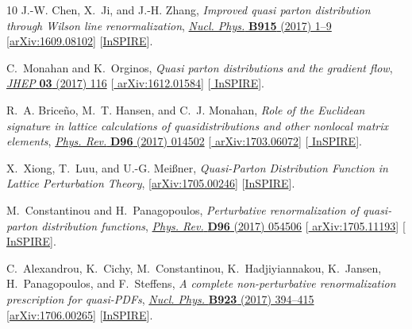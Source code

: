 \begin{thebibliography}{10}
J.-W. Chen, X.~Ji, and J.-H. Zhang, {\it {Improved quasi parton distribution
  through Wilson line renormalization}},
\href{http://dx.doi.org/10.1016/j.nuclphysb.2016.12.004}{{\em Nucl. Phys.}
  {\bfseries B915} (2017) 1--9}
  [\href{http://arxiv.org/abs/1609.08102}{{\ttfamily arXiv:1609.08102}}]
  [\href{http://inspirehep.net/record/1488113}{{\ttfamily InSPIRE}}].

C.~Monahan and K.~Orginos, {\it {Quasi parton distributions and the gradient
  flow}},
\href{http://dx.doi.org/10.1007/JHEP03(2017)116}{{\em JHEP} {\bfseries 03}
  (2017) 116} [\href{http://arxiv.org/abs/1612.01584}{{\ttfamily
  arXiv:1612.01584}}] [\href{http://inspirehep.net/record/1501937}{{\ttfamily
  InSPIRE}}].

R.~A. Brice\~{n}o, M.~T. Hansen, and C.~J. Monahan, {\it {Role of the Euclidean
  signature in lattice calculations of quasidistributions and other nonlocal
  matrix elements}},
\href{http://dx.doi.org/10.1103/PhysRevD.96.014502}{{\em Phys. Rev.} {\bfseries
  D96} (2017) 014502} [\href{http://arxiv.org/abs/1703.06072}{{\ttfamily
  arXiv:1703.06072}}] [\href{http://inspirehep.net/record/1518148}{{\ttfamily
  InSPIRE}}].

X.~Xiong, T.~Luu, and U.-G. Mei{\ss}ner,
{\it {Quasi-Parton Distribution Function in Lattice Perturbation Theory}},
  [\href{http://arxiv.org/abs/1705.00246}{{\ttfamily arXiv:1705.00246}}]
  [\href{http://inspirehep.net/record/1597417}{{\ttfamily InSPIRE}}].

M.~Constantinou and H.~Panagopoulos, {\it {Perturbative renormalization of
  quasi-parton distribution functions}},
\href{http://dx.doi.org/10.1103/PhysRevD.96.054506}{{\em Phys. Rev.} {\bfseries
  D96} (2017) 054506} [\href{http://arxiv.org/abs/1705.11193}{{\ttfamily
  arXiv:1705.11193}}] [\href{http://inspirehep.net/record/1601910}{{\ttfamily
  InSPIRE}}].

C.~Alexandrou, K.~Cichy, M.~Constantinou, K.~Hadjiyiannakou, K.~Jansen,
  H.~Panagopoulos, and F.~Steffens, {\it {A complete non-perturbative
  renormalization prescription for quasi-PDFs}},
\href{http://dx.doi.org/10.1016/j.nuclphysb.2017.08.012}{{\em Nucl. Phys.}
  {\bfseries B923} (2017) 394--415}
  [\href{http://arxiv.org/abs/1706.00265}{{\ttfamily arXiv:1706.00265}}]
  [\href{http://inspirehep.net/record/1602174}{{\ttfamily InSPIRE}}].


\end{thebibliography}
